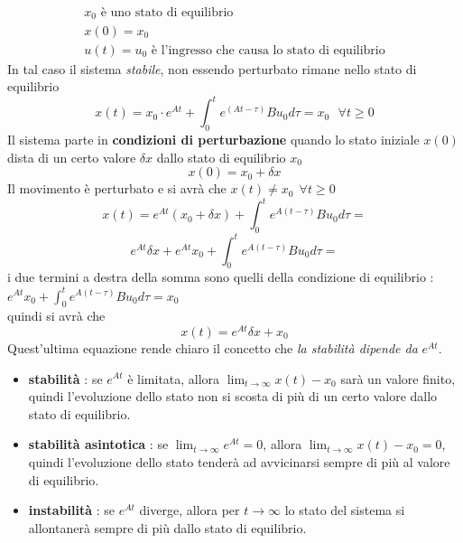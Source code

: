 \documentclass[10pt, letterpaper]{report}
\begin{document}
$$ \begin{matrix}
   x_0 \text{ è uno stato di equilibrio} \\ x(0)=x_0 \\ u(t)=u_0 \text{ è l'ingresso che causa lo stato di equilibrio}
\end{matrix}$$
In tal caso il sistema \textit{stabile}, non essendo perturbato rimane nello stato di equilibrio 
$$ x(t)= x_0\cdot e^{At}+\int_0^te^{(At-\tau)}Bu_0d\tau =x_0\ \ \ \forall t\ge 0$$
Il sistema parte in \textbf{condizioni di perturbazione} quando lo stato 
iniziale $x(0)$ dista di un certo valore $\delta x$ dallo stato di equilibrio $x_0$
$$ x(0)=x_0+\delta x$$
Il movimento è perturbato e si avrà che $x(t)\ne x_0 \ \ \forall t\ge 0$
$$x(t)=e^{At}(x_0+\delta x)+\int_0^te^{A(t-\tau)}Bu_0d\tau =$$
$$e^{At}\delta x+e^{At}x_0+\int_0^te^{A(t-\tau)}Bu_0d\tau =$$ 
i due termini a destra della somma sono quelli della condizione di equilibrio : \\$e^{At}x_0+\int_0^te^{A(t-\tau)}Bu_0d\tau=x_0$
\\quindi si avrà che
$$x(t)= e^{At}\delta x+x_0$$
Quest'ultima equazione rende chiaro il concetto che \textit{la stabilità dipende da }$e^{At}$.\begin{itemize}
    \item \textbf{stabilità} : se $e^{At}$ è limitata, allora $\displaystyle\lim_{t\rightarrow\infty}x(t)-x_0$ 
    sarà un valore finito, quindi l'evoluzione dello stato non si scosta di più di un certo valore dallo stato 
    di equilibrio. 
    \item \textbf{stabilità asintotica} : se $\displaystyle\lim_{t\rightarrow\infty}e^{At}=0$, allora 
     $\displaystyle\lim_{t\rightarrow\infty}x(t)-x_0=0$, quindi l'evoluzione dello stato tenderà ad avvicinarsi 
     sempre di più al valore di equilibrio.
     \item \textbf{instabilità} : se $e^{At}$ diverge, allora per $t\rightarrow\infty$ lo stato del sistema 
     si allontanerà sempre di più dallo stato di equilibrio.
\end{itemize}
\end{document}
